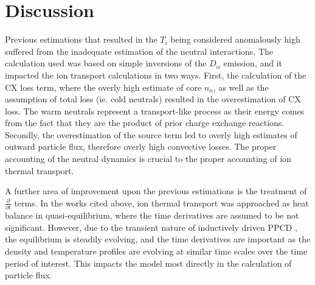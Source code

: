\documentclass[aip, pop, preprint]{revtex4-1}
\begin{document}
\section{Discussion}
Previous estimations that resulted in the $T_i$ being considered anomalously
high suffered from the inadequate estimation of the neutral
interactions\cite{Fiksel2006,BiewerThesis, Wyman2007}. The calculation used was based on
simple inversions of the $D_{\alpha}$ emission, and it impacted the ion transport
calculations in two ways. First, the calculation of the CX loss term, where the
overly high estimate of core $n_n$, as well as the assumption of total loss
(ie. cold neutrals) resulted in the overestimation of CX loss. The warm neutrals represent a transport-like process as their energy comes from the fact that they are the product of prior charge exchange reactions. Secondly, the
overestimation of the source term led to overly high estimates of
outward particle flux, therefore overly high convective losses. The proper
accounting of the neutral dynamics is crucial to the proper
accounting of ion thermal transport. 

A further area of improvement upon the previous estimations is the treatment of $\frac{\partial}{\partial t}$ terms. In the works cited above, ion thermal transport was approached as heat balance in quasi-equilibrium, where the time derivatives are assumed to be not significant. However, due to the transient nature of inductively driven PPCD \cite{Sarff1995TransportPinch}, the equilibrium is steadily evolving, and  the time derivatives are important as the density and temperature profiles are evolving at similar time scales over the time period of interest. This impacts the model most directly in the calculation of particle flux.


\end{document}
